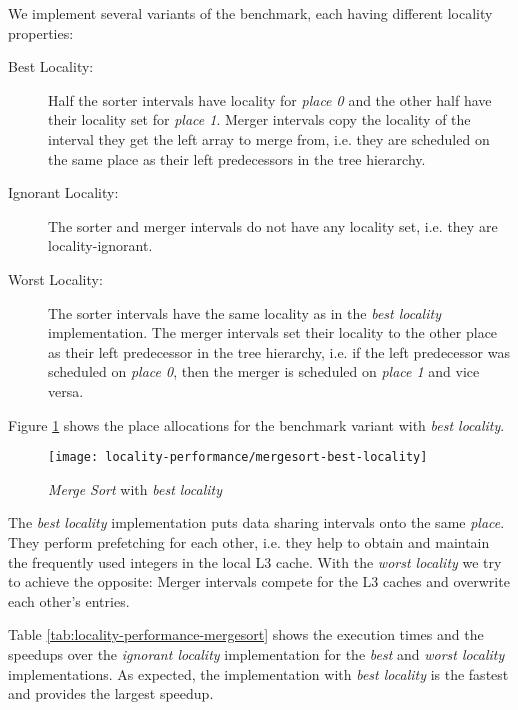 We implement several variants of the benchmark, each having different
locality properties:

\begin{description}
\item[Best Locality:] Half the sorter intervals have locality for
  \emph{place 0} and the other half have their locality set for
  \emph{place 1}. Merger intervals copy the locality of the interval
  they get the left array to merge from, i.e. they are scheduled on
  the same place as their left predecessors in the tree hierarchy.
\item[Ignorant Locality:] The sorter and merger intervals do not have
  any locality set, i.e. they are locality-ignorant.
\item[Worst Locality:] The sorter intervals have the same locality as
  in the \emph{best locality} implementation. The merger intervals set
  their locality to the other place as their left predecessor in the
  tree hierarchy, i.e. if the left predecessor was scheduled on
  \emph{place 0}, then the merger is scheduled on \emph{place 1} and
  vice versa.
\end{description}

Figure \ref{fig:locality-performance-mergesort-best-locality} shows
the place allocations for the benchmark variant with \emph{best
  locality}.

\begin{figure}[!ht]
  \centering
  \texttt{[image: locality-performance/mergesort-best-locality]}
  \caption{\emph{Merge Sort} with \emph{best locality}}
  \label{fig:locality-performance-mergesort-best-locality}
\end{figure}

The \emph{best locality} implementation puts data sharing intervals
onto the same \emph{place}. They perform prefetching for each other,
i.e. they help to obtain and maintain the frequently used integers in
the local L3 cache. With the \emph{worst locality} we try to achieve
the opposite: Merger intervals compete for the L3 caches and overwrite
each other's entries.

Table \ref{tab:locality-performance-mergesort} shows the execution
times and the speedups over the \emph{ignorant locality}
implementation for the \emph{best} and \emph{worst locality}
implementations. As expected, the implementation with \emph{best
  locality} is the fastest and provides the largest speedup.

